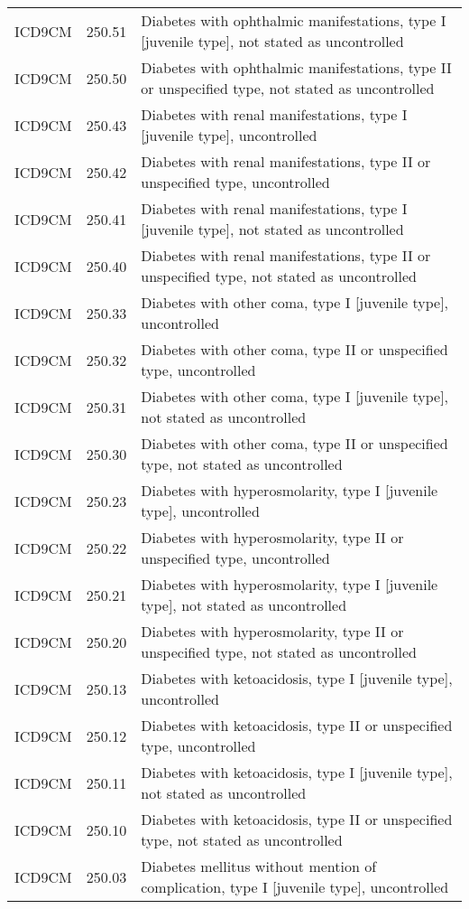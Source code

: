\begin{table}[ht]
\begin{tabular}{lll}
  ICD9CM & 250.51 & Diabetes with ophthalmic manifestations, type I [juvenile type], not stated as uncontrolled \\ 
  ICD9CM & 250.50 & Diabetes with ophthalmic manifestations, type II or unspecified type, not stated as uncontrolled \\ 
  ICD9CM & 250.43 & Diabetes with renal manifestations, type I [juvenile type], uncontrolled \\ 
  ICD9CM & 250.42 & Diabetes with renal manifestations, type II or unspecified type, uncontrolled \\ 
  ICD9CM & 250.41 & Diabetes with renal manifestations, type I [juvenile type], not stated as uncontrolled \\ 
  ICD9CM & 250.40 & Diabetes with renal manifestations, type II or unspecified type, not stated as uncontrolled \\ 
  ICD9CM & 250.33 & Diabetes with other coma, type I [juvenile type], uncontrolled \\ 
  ICD9CM & 250.32 & Diabetes with other coma, type II or unspecified type, uncontrolled \\ 
  ICD9CM & 250.31 & Diabetes with other coma, type I [juvenile type], not stated as uncontrolled \\ 
  ICD9CM & 250.30 & Diabetes with other coma, type II or unspecified type, not stated as uncontrolled \\ 
  ICD9CM & 250.23 & Diabetes with hyperosmolarity, type I [juvenile type], uncontrolled \\ 
  ICD9CM & 250.22 & Diabetes with hyperosmolarity, type II or unspecified type, uncontrolled \\ 
  ICD9CM & 250.21 & Diabetes with hyperosmolarity, type I [juvenile type], not stated as uncontrolled \\ 
  ICD9CM & 250.20 & Diabetes with hyperosmolarity, type II or unspecified type, not stated as uncontrolled \\ 
  ICD9CM & 250.13 & Diabetes with ketoacidosis, type I [juvenile type], uncontrolled \\ 
  ICD9CM & 250.12 & Diabetes with ketoacidosis, type II or unspecified type, uncontrolled \\ 
  ICD9CM & 250.11 & Diabetes with ketoacidosis, type I [juvenile type], not stated as uncontrolled \\ 
  ICD9CM & 250.10 & Diabetes with ketoacidosis, type II or unspecified type, not stated as uncontrolled \\ 
  ICD9CM & 250.03 & Diabetes mellitus without mention of complication, type I [juvenile type], uncontrolled \\ 

\end{tabular}
\end{table}
